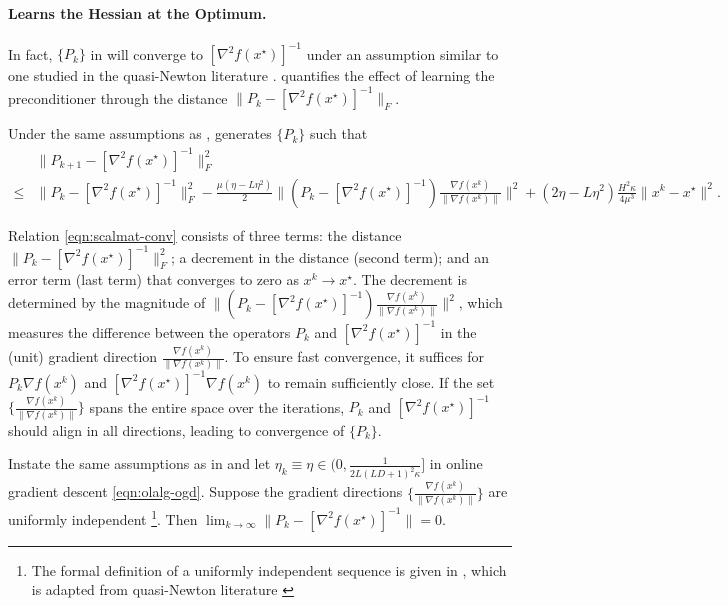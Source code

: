 \paragraph{{\hdm} Learns the Hessian at the Optimum.}
In fact, $\{P_k\}$ in {\hdm} will converge to $[\nabla^2 f (x^{\star})]^{-1}$ under an assumption similar to one studied in the quasi-Newton literature \cite{conn1991convergence, nocedal1999numerical}.  quantifies the effect of learning the preconditioner through the distance $\|P_{k} - [\nabla^2 f (x^{\star})]^{-1}\|_F$.
\begin{lem}\label{lem:scalmat-conv}
  Under the same assumptions as ,  generates $\{P_k\}$ such that
\begin{align}
&\| P_{k + 1} - [\nabla^2 f (x^{\star})]^{- 1} \|_F^2 \nonumber \\
\leq{} & \| P_k - [\nabla^2 f (x^{\star})]^{- 1} \|_F^2  - \tfrac{\mu (\eta - L \eta^2)}{2} \big\| (P_k - [\nabla^2 f (x^{\star})]^{- 1}) \tfrac{\nabla f (x^k)}{\| \nabla f (x^k) \|} \big\|^2 
+ (2\eta - L \eta^2) \tfrac{H^2 \kappa}{4 \mu^3}\| x^k - x^{\star} \|^2.  \label{eqn:scalmat-conv}
\end{align}
\end{lem}
Relation \eqref{eqn:scalmat-conv} consists of three terms: the distance $\| P_k - [\nabla^2 f (x^{\star})]^{- 1} \|_F^2$; a decrement in the distance (second term); and an error term (last term) that converges to zero as $x^k \rightarrow x^{\star}$.
The decrement is determined by the magnitude of $\big\| (P_k - [\nabla^2 f (x^{\star})]^{- 1}) \tfrac{\nabla f (x^k)}{\| \nabla f (x^k) \|} \big\|^2$, which measures the difference between the operators $P_k$ and $[\nabla^2 f (x^{\star})]^{-1}$ in the (unit) gradient direction $\tfrac{\nabla f (x^k)}{\|\nabla f (x^k)\|}$.
To ensure fast convergence, it suffices for $P_k \nabla f (x^k)$ and $[\nabla^2 f (x^{\star})]^{-1} \nabla f (x^k)$ to remain sufficiently close. If the set $\big\{ \tfrac{\nabla f (x^k)}{\|\nabla f (x^k)\|} \big\}$ spans the entire space over the iterations, $P_k$ and $[\nabla^2 f (x^{\star})]^{-1}$ should align in all directions, leading to convergence of $\{P_k\}$.

\begin{thm}\label{thm:scal-mat-conv}
Instate the same assumptions as in  and let $\eta_k \equiv \eta \in (0, \tfrac{1}{2L(LD+1)^2 \kappa}]$ in online gradient descent \eqref{eqn:olalg-ogd}. Suppose the gradient directions
$\big\{ \tfrac{\nabla f (x^k)}{\| \nabla f (x^k) \|} \big\}$ are uniformly independent \footnote{The formal definition of a uniformly independent sequence is given in , which is adapted from quasi-Newton literature \cite{conn1991convergence, nocedal1999numerical}}. Then 
$\lim_{k \rightarrow \infty}  \| P_k - [\nabla^2 f (x^{\star})]^{- 1} \| = 0$.
\end{thm}

